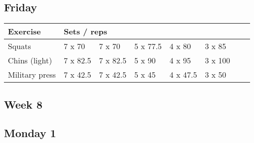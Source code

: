 \documentclass[12pt, a4paper]{article}%
\begin{document}
  \subsection*{\hspace{0.5em} Friday }


  \begin{tabular}{l|lllllll}
  \hspace{0.75em} \textbf{Exercise} & \multicolumn{ 7 }{l}{ \textbf{Sets / reps} } \\ \hline

            \hspace{0.75em} Squats
            & 7 x 70
            & 7 x 70
            & 5 x 77.5
            & 4 x 80
            & 3 x 85
            & 
            & 
            \\


            \hspace{0.75em} Chins (light)
            & 7 x 82.5
            & 7 x 82.5
            & 5 x 90
            & 4 x 95
            & 3 x 100
            & 
            & 
            \\


            \hspace{0.75em} Military press
            & 7 x 42.5
            & 7 x 42.5
            & 5 x 45
            & 4 x 47.5
            & 3 x 50
            & 
            & 
            \\


  \end{tabular}


\clearpage \subsection*{\hspace{0.25em} Week 8 }
  \subsection*{\hspace{0.5em} Monday 1 }
\end{document}
